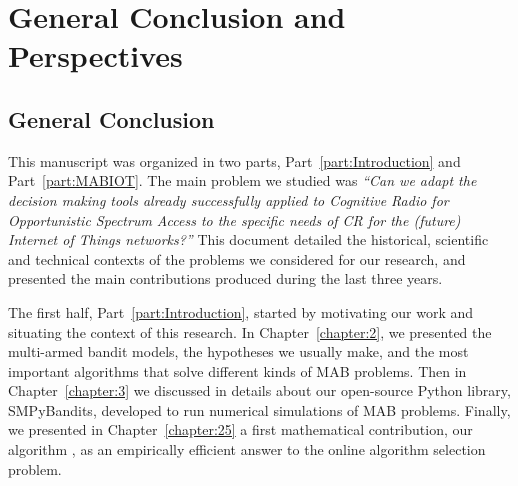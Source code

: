 
\chapter{General Conclusion and Perspectives}
\label{chapter:conclusion}

\graphicspath{{2-Chapters/6-Chapter/Images/}}



\section{General Conclusion}


This manuscript was organized in two parts, Part~\ref{part:Introduction} and Part~\ref{part:MABIOT}.
%
The main problem we studied was \emph{``Can we adapt the decision making tools already successfully applied to Cognitive Radio for Opportunistic Spectrum Access to the specific needs of CR for the (future) Internet of Things networks?''}
%
This document detailed the historical, scientific and technical contexts of the problems we considered for our research, and presented the main contributions produced during the last three years.

The first half, Part~\ref{part:Introduction}, started by motivating our work and situating the context of this research.
In Chapter~\ref{chapter:2}, we presented the multi-armed bandit models, the hypotheses we usually make, and the most important algorithms that solve different kinds of MAB problems.
Then in Chapter~\ref{chapter:3} we discussed in details about our open-source Python library, SMPyBandits, developed to run numerical simulations of MAB problems.
%
Finally, we presented in Chapter~\ref{chapter:25} a first mathematical contribution, our algorithm \Aggr, as an empirically efficient answer to the online algorithm selection problem.

